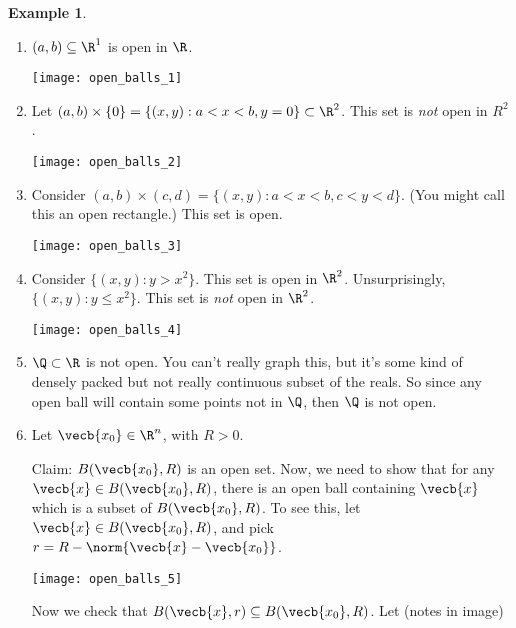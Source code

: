\documentclass[a5paper]{article}
\theoremstyle{definition}%
\newtheorem*{example*}{Example}
\numberwithin{exercise}{section}
\theoremstyle{remark}%
\begin{document}
\begin{example*}
\begin{enumerate}\mbox{}

\item $(a,b)\subseteq\R^1$ is open in $\R$.
\begin{center}
\texttt{[image: open\_balls\_1]}
\end{center}

\item Let $(a,b)\times\{0\}=\{(x,y):a<x<b, y=0\}\subset \R^2$. This set is \emph{not} open in $R^2$. 
\begin{center}
\texttt{[image: open\_balls\_2]}
\end{center}

\item Consider $(a,b)\times(c,d)=\{(x,y):a<x<b, c<y<d\}$. (You might call this an open rectangle.) This set is open. 
\begin{center}
\texttt{[image: open\_balls\_3]}
\end{center}

\item Consider $\{(x,y):y>x^2\}$. This set is open in $\R^2$.
Unsurprisingly, $\{(x,y):y\leq x^2\}$. This set is \emph{not} open in $\R^2$.
\begin{center}
\texttt{[image: open\_balls\_4]}
\end{center}

\item $\Q\subset\R$ is not open. You can't really graph this, but it's some kind of densely packed but not really continuous subset of the reals. So since any open ball will contain some points not in $\Q$, then $\Q$ is not open. 

\item Let $\vecb{x_0}\in \R^n$, with $R>0$.

Claim: $B(\vecb{x_0},R)$ is an open set. Now, we need to show that for any $\vecb{x}\in B(\vecb{x_0},R)$, there is an open ball containing $\vecb{x}$ which is a subset of $B(\vecb{x_0},R)$. To see this, let $\vecb{x}\in B(\vecb{x_0},R)$, and pick $r=R-\norm{\vecb{x}-\vecb{x_0}}$. 

\begin{center}
\texttt{[image: open\_balls\_5]}
\end{center}

Now we check that $B(\vecb{x},r)\subseteq B(\vecb{x_0},R)$. Let 
(notes in image)

\end{enumerate}
\end{example*}
\end{document}
